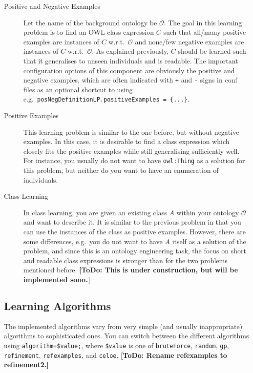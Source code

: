\documentclass[a4paper,12pt]{scrartcl}
\newcommand{\todo}[1]{\textbf{[ToDo: #1]}}
\begin{document}
\begin{description}
 \item[Positive and Negative Examples] Let the name of the background ontology be $\mathcal{O}$. The goal in this learning problem is to find an OWL class expression $C$ such that all/many positive examples are instances of $C$ w.r.t.~$\mathcal{O}$ and none/few negative examples are instances of $C$ w.r.t.~$\mathcal{O}$. As explained previously, $C$ should be learned such that it generalises to unseen individuals and is readable. The important configuration options of this component are obviously the positive and negative examples, which are often indicated with \verb|+| and \verb|-| signs in conf files as an optional shortcut to using e.g.~\verb|posNegDefinitionLP.positiveExamples = {...}|.
 \item[Positive Examples] This learning problem is similar to the one before, but without negative examples. In this case, it is desirable to find a class expression which closely fits the positive examples while still generalising sufficiently well. For instance, you usually do not want to have \verb|owl:Thing| as a solution for this problem, but neither do you want to have an enumeration of individuals.
 \item[Class Learning] In class learning, you are given an existing class $A$ within your ontology $\mathcal{O}$ and want to describe it. It is similar to the previous problem in that you can use the instances of the class as positive examples. However, there are some differences, e.g.~you do not want to have $A$ itself as a solution of the problem, and since this is an ontology engineering task, the focus on short and readable class expressions is stronger than for the two problems mentioned before. \todo{This is under construction, but will be implemented soon.}
\end{description}

\subsection{Learning Algorithms}

The implemented algorithms vary from very simple (and usually inappropriate) algorithms to sophisticated ones. You can switch between the different algorithms using \verb|algorithm=$value;|, where \verb|$value| is one of \verb|bruteForce|, \verb|random|, \verb|gp|, \verb|refinement|, \verb|refexamples|, and \verb|celoe|. \todo{Rename refexamples to refinement2.}
\end{document}
